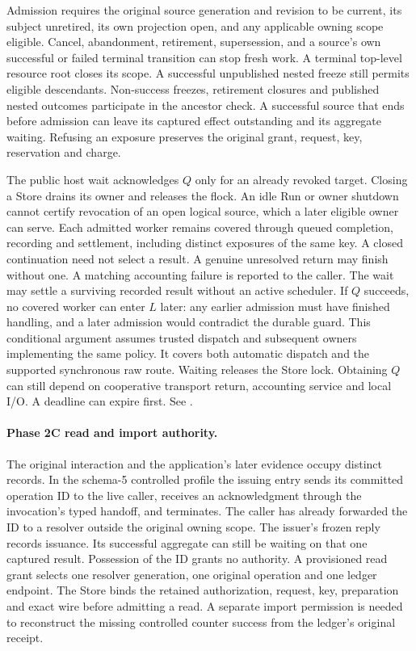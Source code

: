 \documentclass[11pt,a4paper]{article}
\theoremstyle{definition}
\theoremstyle{remark}
\begin{document}
Admission requires the original source generation and revision to be current, its subject unretired, its own projection open, and any applicable owning scope eligible. Cancel, abandonment, retirement, supersession, and a source's own successful or failed terminal transition can stop fresh work. A terminal top-level resource root closes its scope. A successful unpublished nested freeze still permits eligible descendants. Non-success freezes, retirement closures and published nested outcomes participate in the ancestor check. A successful source that ends before admission can leave its captured effect outstanding and its aggregate waiting. Refusing an exposure preserves the original grant, request, key, reservation and charge.

The public host wait acknowledges $Q$ only for an already revoked target. Closing a Store drains its owner and releases the flock. An idle Run or owner shutdown cannot certify revocation of an open logical source, which a later eligible owner can serve. Each admitted worker remains covered through queued completion, recording and settlement, including distinct exposures of the same key. A closed continuation need not select a result. A genuine unresolved return may finish without one. A matching accounting failure is reported to the caller. The wait may settle a surviving recorded result without an active scheduler. If $Q$ succeeds, no covered worker can enter $L$ later: any earlier admission must have finished handling, and a later admission would contradict the durable guard. This conditional argument assumes trusted dispatch and subsequent owners implementing the same policy. It covers both automatic dispatch and the supported synchronous raw route. Waiting releases the Store lock. Obtaining $Q$ can still depend on cooperative transport return, accounting service and local I/O. A deadline can expire first. See .

\paragraph{Phase 2C read and import authority.} The original interaction and the application's later evidence occupy distinct records. In the schema-5 controlled profile the issuing entry sends its committed operation ID to the live caller, receives an acknowledgment through the invocation's typed handoff, and terminates. The caller has already forwarded the ID to a resolver outside the original owning scope. The issuer's frozen reply records issuance. Its successful aggregate can still be waiting on that one captured result. Possession of the ID grants no authority. A provisioned read grant selects one resolver generation, one original operation and one ledger endpoint. The Store binds the retained authorization, request, key, preparation and exact wire before admitting a read. A separate import permission is needed to reconstruct the missing controlled counter success from the ledger's original receipt.
\end{document}
